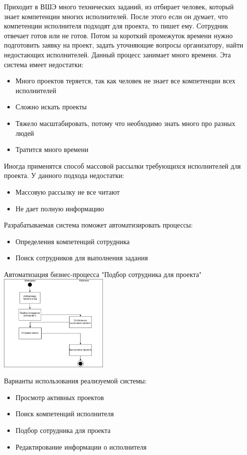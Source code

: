 \documentclass[PI,KR]{HSEUniversity}
\begin{document}
Приходит в ВШЭ много технических заданий, из отбирает человек, который знает компетенции многих исполнителей. После этого если он думает, что компетенции исполнителя подходят для проекта, то пишет ему. Сотрудник отвечает готов или не готов. Потом за короткий промежуток времени нужно подготовить заявку на проект, задать уточняющие вопросы организатору, найти недостающих исполнителей. Данный процесс занимает много времени. Эта система имеет недостатки:
\begin{itemize}
	\item Много проектов теряется, так как человек не знает все компетенции всех исполнителей
	\item Сложно искать проекты
	\item Тяжело масштабировать, потому что необходимо знать много про разных людей
	\item Тратится много времени
\end{itemize}

Иногда применятся способ массовой рассылки требующихся исполнителей для проекта. У данного подхода недостатки: 
\begin{itemize}
	\item Массовую рассылку не все читают
	\item Не дает полную информацию
\end{itemize}

Разрабатываемая система поможет автоматизировать процессы:
\begin{itemize}
	\item Определения компетенций сотрудника
	\item Поиск сотрудников для выполнения задания
\end{itemize}
\begin{FIGURE}[h]{Автоматизация бизнес-процесса "Подбор сотрудника для проекта" \label{fig:figure1}}
	\includegraphics[width=0.4\textwidth]{img/Диаграмма Бизнес-процесса}
\end{FIGURE}
Варианты использования реализуемой системы:
\begin{itemize}
	\item Просмотр активных проектов
	\item Поиск компетенций исполнителя
	\item Подбор сотрудника для проекта
	\item Редактирование информации о исполнителя
\end{itemize}
\end{document}
